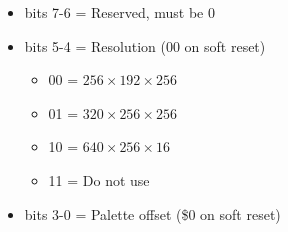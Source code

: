 \begin{itemize}
\item bits 7-6 = Reserved, must be 0
\item bits 5-4 = Resolution (00 on soft reset)
  \begin{itemize}
  \item 00 = $256\times192\times256$
  \item 01 = $320\times256\times256$
  \item 10 = $640\times256\times16$
  \item 11 = Do not use
  \end{itemize}
\item bits 3-0 = Palette offset (\$0 on soft reset)
\end{itemize}

